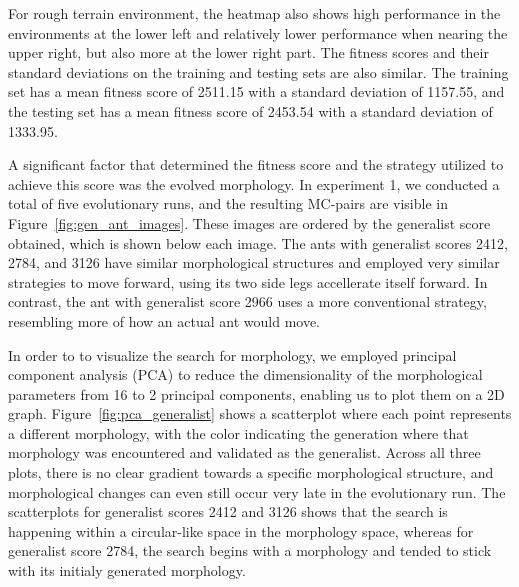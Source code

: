        For rough terrain environment, the heatmap also shows high performance in the environments at the lower left and relatively lower performance when nearing the upper right, but also more at the lower right part. The fitness scores and their standard deviations on the training and testing sets are also similar. The training set has a mean fitness score of 2511.15 with a standard deviation of 1157.55, and the testing set has a mean fitness score of 2453.54 with a standard deviation of 1333.95.
        
        A significant factor that determined the fitness score and the strategy utilized to achieve this score was the evolved morphology. In experiment 1, we conducted a total of five evolutionary runs, and the resulting MC-pairs are visible in Figure~\ref{fig:gen_ant_images}. These images are ordered by the generalist score obtained, which is shown below each image. The ants with generalist scores 2412, 2784, and 3126 have similar morphological structures and employed very similar strategies to move forward, using its two side legs accellerate itself forward. In contrast, the ant with generalist score 2966 uses a more conventional strategy, resembling more of how an actual ant would move.

        In order to to visualize the search for morphology, we employed principal component analysis (PCA) to reduce the dimensionality of the morphological parameters from 16 to 2 principal components, enabling us to plot them on a 2D graph. Figure~\ref{fig:pca_generalist} shows a scatterplot where each point represents a different morphology, with the color indicating the generation where that morphology was encountered and validated as the generalist. Across all three plots, there is no clear gradient towards a specific morphological structure, and morphological changes can even still occur very late in the evolutionary run. The scatterplots for generalist scores 2412 and 3126 shows that the search is happening within a circular-like space in the morphology space, whereas for generalist score 2784, the search begins with a morphology and tended to stick with its initialy generated morphology. 


